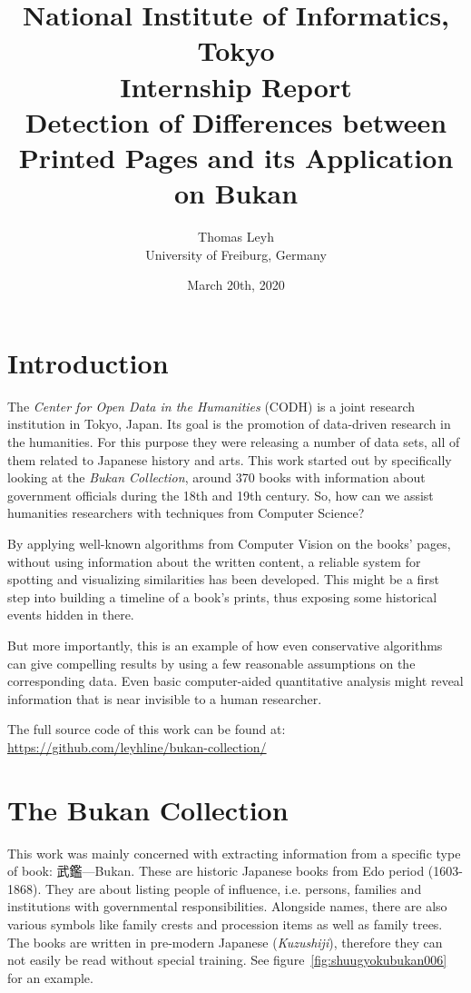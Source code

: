\documentclass{ltjarticle}
\title{\large National Institute of Informatics, Tokyo \\ Internship Report \\ \LARGE Detection of Differences between Printed Pages and its Application on Bukan}
\author{Thomas Leyh \\ University of Freiburg, Germany}
\date{March 20th, 2020}
\begin{document}
\clearpage\maketitle
\thispagestyle{empty}

\tableofcontents

\pagebreak
\setcounter{page}{1}

\section{Introduction}

The \emph{Center for Open Data in the Humanities} (CODH) is a joint research institution in Tokyo, Japan. Its goal is the promotion of data-driven research in the humanities.\cite{kitamoto2017codh} For this purpose they were releasing a number of data sets, all of them related to Japanese history and arts. This work started out by specifically looking at the \emph{Bukan Collection}\cite{codh2018bukan}, around 370 books with information about government officials during the 18th and 19th century. So, how can we assist humanities researchers with techniques from Computer Science?

By applying well-known algorithms from Computer Vision on the books' pages, without using information about the written content, a reliable system for spotting and visualizing similarities has been developed. This might be a first step into building a timeline of a book's prints, thus exposing some historical events hidden in there.

But more importantly, this is an example of how even conservative algorithms can give compelling results by using a few reasonable assumptions on the corresponding data. Even basic computer-aided quantitative analysis might reveal information that is near invisible to a human researcher.

The full source code of this work can be found at: \url{https://github.com/leyhline/bukan-collection/}

\section{The Bukan Collection}

This work was mainly concerned with extracting information from a specific type of book: 武鑑---Bukan. These are historic Japanese books from Edo period (1603-1868). They are about listing people of influence, i.e. persons, families and institutions with governmental responsibilities. Alongside names, there are also various symbols like family crests and procession items as well as family trees. The books are written in pre-modern Japanese (\emph{Kuzushiji}), therefore they can not easily be read without special training.\cite{hakim2019} See figure~\ref{fig:shuugyokubukan006} for an example.
\end{document}
